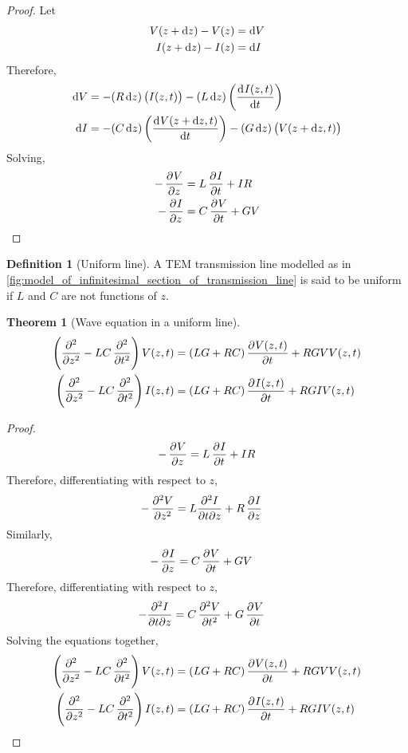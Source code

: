 \documentclass[titlepage, fleqn, a4paper, 12pt, twoside]{article}
\theoremstyle{definition}
\newtheorem{definition}{Definition}
\theoremstyle{theorem}
\newtheorem{theorem}{Theorem}
\begin{document}
\begin{proof}
	Let
	\begin{align*}
		V(z + \dif z) - V(z) &= \dif V\\
		I(z + \dif z) - I(z) &= \dif I\\
	\end{align*}
	Therefore,
	\begin{align*}
		\dif V &= -(R \dif z) \left( I(z,t) \right) - (L \dif z) \left( \dod{I(z,t)}{t} \right)\\
		\dif I &= -(C \dif z) \left( \dod{V(z + \dif z,t)}{t} \right) - (G \dif z) \left( V(z + \dif z,t) \right)
	\end{align*}
	Solving,
	\begin{align*}
		-\dpd{V}{z} &= L \dpd{I}{t} + I R\\
		-\dpd{I}{z} &= C \dpd{V}{t} + G V
	\end{align*}
\end{proof}

\begin{definition}[Uniform line]
	A TEM transmission line modelled as in \cref{fig:model_of_infinitesimal_section_of_transmission_line} is said to be uniform if $L$ and $C$ are not functions of $z$.
\end{definition}

\begin{theorem}[Wave equation in a uniform line]
	\begin{align*}
		\left( \dpd[2]{}{z} - L C \dpd[2]{}{t} \right) V(z,t) &= (L G + R C) \dpd{V(z,t)}{t} + R G V V(z,t)\\
		\left( \dpd[2]{}{z} - L C \dpd[2]{}{t} \right) I(z,t) &= (L G + R C) \dpd{I(z,t)}{t} + R G I V(z,t)
	\end{align*}
	\label{thm:wave_equation_in_a_uniform_line}
\end{theorem}

\begin{proof}
	\begin{align*}
		-\dpd{V}{z} &= L \dpd{I}{t} + I R\\
	\end{align*}
	Therefore, differentiating with respect to $z$,
	\begin{align*}
		-\dpd[2]{V}{z} &= L \frac{\partial^2 I}{\partial t \partial z} + R \dpd{I}{z}
	\end{align*}
	Similarly,
	\begin{align*}
		-\dpd{I}{z} &= C \dpd{V}{t} + G V
	\end{align*}
	Therefore, differentiating with respect to $z$,
	\begin{align*}
		-\frac{\partial^2 I}{\partial t \partial z} &= C \dpd[2]{V}{t} + G \dpd{V}{t}
	\end{align*}
	Solving the equations together,
	\begin{align*}
		\left( \dpd[2]{}{z} - L C \dpd[2]{}{t} \right) V(z,t) &= (L G + R C) \dpd{V(z,t)}{t} + R G V V(z,t)\\
		\left( \dpd[2]{}{z} - L C \dpd[2]{}{t} \right) I(z,t) &= (L G + R C) \dpd{I(z,t)}{t} + R G I V(z,t)
	\end{align*}
\end{proof}
\end{document}
